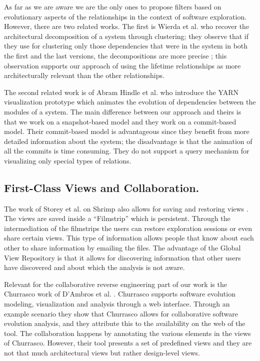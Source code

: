 \documentclass[preprint,12pt]{elsarticle}
\begin{document}
As far as we are aware we are the only ones to propose filters based on evolutionary aspects of the relationships in the context of software exploration. However, there are two related works. The first is Wierda et al. who recover the architectural decomposition of a system through clustering; they observe that if they use for clustering only those dependencies that were in the system in both the first and the last versions, the decompositions are more precise \cite{wierda-clustering}; this observation supports our approach of using the lifetime relationships as more architecturally relevant than the other relationships. 

The second related work is of Abram Hindle et al. \cite{hindle-yarn} who introduce the YARN visualization prototype which animates the evolution of dependencies between the modules of a system. The main difference between our approach and theirs is that we work on a snapshot-based model and they work on a commit-based model. Their commit-based model is advantageous since they benefit from more detailed information about the system; the disadvantage is that the animation of all the commits is time consuming. They do not support a query mechanism for visualizing only special types of relations.


\subsection {First-Class Views and Collaboration.} The work of Storey et al. on Shrimp also allows for saving and restoring views \cite{rayside-flow}. The views are saved inside a ``Filmstrip'' which is persistent. Through the intermediation of the filmstrips the users can restore exploration sessions or even share certain views. This type of information allows people that know about each other to share information by emailing the files. The advantage of the Global View Repository is that it allows for discovering information that other users have discovered and about which the analysis is not aware. 


Relevant for the collaborative reverse engineering part of our work is the Churrasco work of D’Ambros et al. \cite{dambros-churrasco}. Churrasco supports software evolution modeling, visualization and analysis through a web interface. 
Through an example scenario they show that Churrasco allows for collaborative software evolution analysis, and they attribute this to the availability on the web of the tool. The collaboration happens by annotating the various elements in the views of Churrasco. However, their tool presents a set of predefined views and they are not that much architectural views but rather design-level views. 
\end{document}
